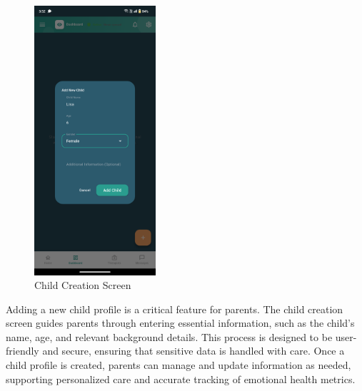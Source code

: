 ﻿\documentclass[12pt,a4paper]{article}
\begin{document}
\begin{figure}[H]
    \centering
    \includegraphics[width=0.4\textwidth]{Screenshots/childcreation.png}
    \caption{Child Creation Screen}
    \label{fig:child-creation}
\end{figure}
Adding a new child profile is a critical feature for parents. The child creation screen guides parents through entering essential information, such as the child's name, age, and relevant background details. This process is designed to be user-friendly and secure, ensuring that sensitive data is handled with care. Once a child profile is created, parents can manage and update information as needed, supporting personalized care and accurate tracking of emotional health metrics.
\end{document}
